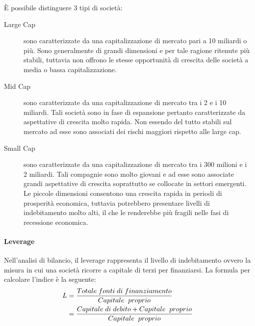 \`E possibile distinguere 3 tipi di società: 
\begin{description}
	\item[Large Cap] sono caratterizzate da una capitalizzazione di mercato pari a 10 miliardi o più. Sono generalmente di grandi dimensioni e per tale ragione ritenute più stabili, tuttavia non offrono le stesse opportunità di crescita delle società a media o bassa capitalizzazione.
	\item[Mid Cap] sono caratterizzate da una capitalizzazione di mercato tra i 2 e i 10 miliardi. Tali società sono  in fase di espansione pertanto caratterizzate da aspettative di crescita molto rapida. Non essendo del tutto stabili sul mercato ad esse sono associati dei rischi maggiori rispetto alle large cap.
	\item[Small Cap]sono caratterizzate da una capitalizzazione di mercato tra i 300 milioni e i 2 miliardi. Tali compagnie sono molto giovani e ad esse sono associate grandi aspettative di crescita soprattutto se collocate in settori emergenti. Le piccole dimensioni consentono una crescita rapida in periodi di prosperità economica, tuttavia potrebbero presentare livelli di indebitamento molto alti, il che le renderebbe più fragili nelle fasi di recessione economica. 
\end{description}

\paragraph{Leverage}

Nell'analisi di bilancio, il leverage rappresenta il livello di indebitamento ovvero la misura in cui una società ricorre a capitale di terzi per finanziarsi. La formula per calcolare l'indice è la seguente: 
\begin{equation}
\begin{split}
L&=\frac{Totale\hspace{0,1cm}fonti\hspace{0,1cm}di\hspace{0,1cm}finanziamento}{Capitale\hspace{0,2cm}proprio}\\
&= \frac{Capitale\hspace{0,1cm} di\hspace{0,1cm} debito + Capitale\hspace{0,2cm}proprio}{Capitale\hspace{0,2cm}proprio}
\end{split}
\end{equation}

